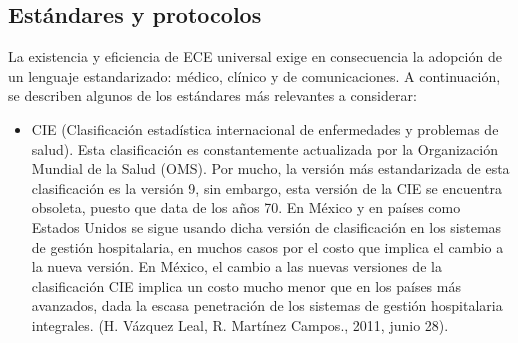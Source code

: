\subsection{Estándares y protocolos}

La existencia y eficiencia de ECE universal exige en consecuencia la adopción de un lenguaje estandarizado: médico, clínico y de comunicaciones. A continuación, se describen algunos de los estándares más relevantes a considerar:
\begin{itemize}
  \item CIE (Clasificación estadística internacional de enfermedades y problemas de salud). Esta clasificación es constantemente actualizada por la Organización Mundial de la Salud (OMS). Por mucho, la versión más estandarizada de esta clasificación es la versión 9, sin embargo, esta versión de la CIE se encuentra obsoleta, puesto que data de los años 70. En México y en países como Estados Unidos se sigue usando dicha versión de clasificación en los sistemas de gestión hospitalaria, en muchos casos por el costo que implica el cambio a la nueva versión. En México, el cambio a las nuevas versiones de la clasificación CIE implica un costo mucho menor que en los países más avanzados, dada la escasa penetración de los sistemas de gestión hospitalaria integrales. (H. Vázquez Leal, R. Martínez Campos., 2011, junio 28).


\end{itemize}

